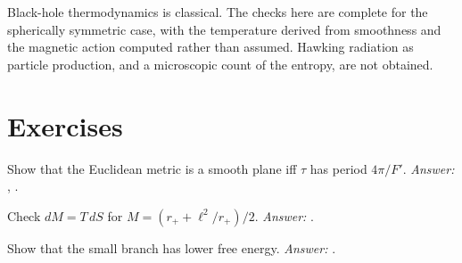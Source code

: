 \begin{standsbox}
Black-hole thermodynamics is classical. The checks here are complete for the spherically symmetric case, with the temperature derived from smoothness and the magnetic action computed rather than assumed. Hawking radiation as particle production, and a microscopic count of the entropy, are not obtained. \open
\end{standsbox}

\section*{Exercises}
\begin{exercise}Show that the Euclidean metric is a smooth plane iff $\tau$ has period $4\pi/F'$. \emph{Answer:} , .\end{exercise}
\begin{exercise}Check $dM=T\,dS$ for $M=(r_++\ell^2/r_+)/2$. \emph{Answer:} .\end{exercise}
\begin{exercise}Show that the small branch has lower free energy. \emph{Answer:} .\end{exercise}
